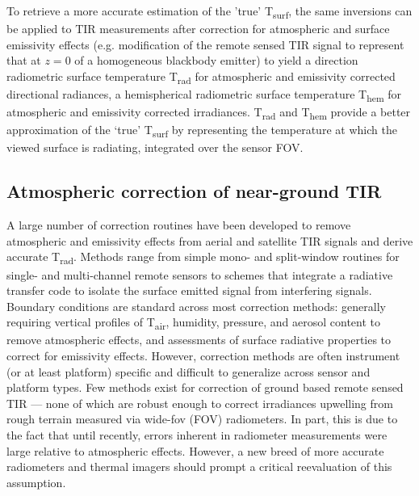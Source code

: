 To retrieve a more accurate estimation of the 'true' T\textsubscript{surf}, the same inversions can be applied to TIR measurements after correction for atmospheric and surface emissivity effects (e.g. modification of the remote sensed TIR signal to represent that at $ z = 0 $ of a homogeneous blackbody emitter) to yield a direction radiometric surface temperature  T\textsubscript{rad} for atmospheric and emissivity corrected directional radiances, a hemispherical radiometric surface temperature T\textsubscript{hem} for atmospheric and emissivity corrected irradiances. T\textsubscript{rad} and T\textsubscript{hem} provide a better approximation of the ‘true’ T\textsubscript{surf} by representing the temperature at which the viewed surface is radiating, integrated over the sensor FOV.


\subsection{Atmospheric correction of near-ground TIR} \label{Atmospheric correction of near-ground TIR}

A large number of correction routines have been developed to remove atmospheric and emissivity effects from aerial and satellite TIR signals and derive accurate T\textsubscript{rad}. Methods range from simple mono- \cite{Qin2001} and split-window \cite{Wan1996} routines for single- and multi-channel remote sensors to schemes that integrate a radiative transfer code to isolate the surface emitted signal from interfering signals. Boundary conditions are standard across most correction methods: generally requiring vertical profiles of T\textsubscript{air}, humidity, pressure, and aerosol content to remove atmospheric effects, and assessments of surface radiative properties to correct for emissivity effects. However, correction methods are often instrument (or at least platform) specific and difficult to generalize across sensor and platform types. Few methods exist for correction of ground based remote sensed TIR --- none of which are robust enough to correct irradiances upwelling from rough terrain measured via wide-\gls{fov} (FOV) radiometers. In part, this is due to the fact that until recently, errors inherent in radiometer measurements were large relative to atmospheric effects. However, a new breed of more accurate radiometers and thermal imagers should prompt a critical reevaluation of this assumption.

